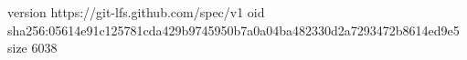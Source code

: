 version https://git-lfs.github.com/spec/v1
oid sha256:05614e91c125781cda429b9745950b7a0a04ba482330d2a7293472b8614ed9e5
size 6038
